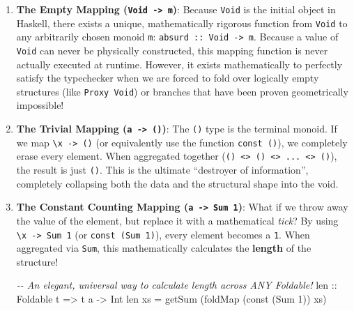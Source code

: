 \documentclass[
]{article}
\newenvironment{Shaded}{}{}
\newcommand{\CommentTok}[1]{\textcolor[rgb]{0.38,0.63,0.69}{\textit{#1}}}
\newcommand{\DataTypeTok}[1]{\textcolor[rgb]{0.56,0.13,0.00}{#1}}
\newcommand{\DecValTok}[1]{\textcolor[rgb]{0.25,0.63,0.44}{#1}}
\newcommand{\FunctionTok}[1]{\textcolor[rgb]{0.02,0.16,0.49}{#1}}
\newcommand{\NormalTok}[1]{#1}
\newcommand{\OtherTok}[1]{\textcolor[rgb]{0.00,0.44,0.13}{#1}}
\begin{document}
\begin{enumerate}
\def\labelenumi{\arabic{enumi}.}
\item
  \textbf{The Empty Mapping (\texttt{Void\ -\textgreater{}\ m})}:
  Because \texttt{Void} is the initial object in Haskell, there exists a
  unique, mathematically rigorous function from \texttt{Void} to any
  arbitrarily chosen monoid \texttt{m}:
  \texttt{absurd\ ::\ Void\ -\textgreater{}\ m}. Because a value of
  \texttt{Void} can never be physically constructed, this mapping
  function is never actually executed at runtime. However, it exists
  mathematically to perfectly satisfy the typechecker when we are forced
  to fold over logically empty structures (like \texttt{Proxy\ Void}) or
  branches that have been proven geometrically impossible!
\item
  \textbf{The Trivial Mapping (\texttt{a\ -\textgreater{}\ ()})}: The
  \texttt{()} type is the terminal monoid. If we map
  \texttt{\textbackslash{}x\ -\textgreater{}\ ()} (or equivalently use
  the function \texttt{const\ ()}), we completely erase every element.
  When aggregated together
  (\texttt{()\ \textless{}\textgreater{}\ ()\ \textless{}\textgreater{}\ ...\ \textless{}\textgreater{}\ ()}),
  the result is just \texttt{()}. This is the ultimate ``destroyer of
  information'', completely collapsing both the data and the structural
  shape into the void.
\item
  \textbf{The Constant Counting Mapping
  (\texttt{a\ -\textgreater{}\ Sum\ 1})}: What if we throw away the
  value of the element, but replace it with a mathematical \emph{tick}?
  By using \texttt{\textbackslash{}x\ -\textgreater{}\ Sum\ 1} (or
  \texttt{const\ (Sum\ 1)}), every element becomes a \texttt{1}. When
  aggregated via \texttt{Sum}, this mathematically calculates the
  \textbf{length} of the structure!

\begin{Shaded}
\begin{Highlighting}[]
\CommentTok{{-}{-} An elegant, universal way to calculate length across ANY Foldable!}
\OtherTok{len ::} \DataTypeTok{Foldable}\NormalTok{ t }\OtherTok{=\textgreater{}}\NormalTok{ t a }\OtherTok{{-}\textgreater{}} \DataTypeTok{Int}
\NormalTok{len xs }\OtherTok{=}\NormalTok{ getSum (}\FunctionTok{foldMap}\NormalTok{ (}\FunctionTok{const}\NormalTok{ (}\DataTypeTok{Sum} \DecValTok{1}\NormalTok{)) xs)}
\end{Highlighting}
\end{Shaded}


\end{enumerate}
\end{document}
